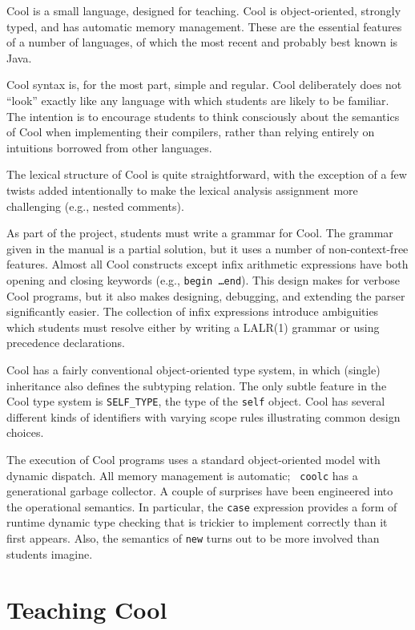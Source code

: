 Cool is a small language, designed for teaching.  Cool is
object-oriented, strongly typed, and has automatic memory management.
These are the essential features of a number of languages, of which
the most recent and probably best known is Java.

Cool syntax is, for the most part, simple and regular.  Cool
deliberately does not ``look'' exactly like any language with which
students are likely to be familiar.  The intention is to encourage
students to think consciously about the semantics of Cool when
implementing their compilers, rather than relying entirely on
intuitions borrowed from other languages.

The lexical structure of Cool is quite straightforward, with the exception
of a few twists added intentionally to make the lexical analysis
assignment more challenging (e.g., nested comments).

As part of the project, students must write a grammar for Cool.  The
grammar given in the manual is a partial solution, but it uses a
number of non-context-free features.  Almost all Cool constructs
except infix arithmetic expressions have both opening and closing
keywords (e.g., {\tt begin \ldots end}).  This design makes for
verbose Cool programs, but it also makes designing, debugging, and extending the
parser significantly easier.  The collection of infix expressions
introduce ambiguities which students must resolve either by writing a
LALR(1) grammar or using precedence declarations.

Cool has a fairly conventional object-oriented type system, in which
(single) inheritance also defines the subtyping relation.  The only
subtle feature in the Cool type system is {\tt SELF\_TYPE}, the type
of the {\tt self} object.  Cool has several different kinds of
identifiers with varying scope rules illustrating common design
choices.

The execution of Cool programs uses a standard object-oriented model
with dynamic dispatch.  All memory management is automatic; {\tt
coolc} has a generational garbage collector.  A couple of surprises
have been engineered into the operational semantics.  In particular,
the {\tt case} expression provides a form of runtime dynamic type
checking that is trickier to implement correctly than it first
appears.  Also, the semantics of {\tt new} turns out to be more
involved than students imagine.

\section{Teaching Cool}

